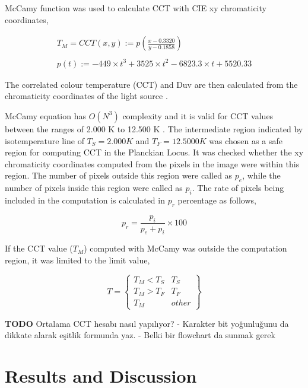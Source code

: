\documentclass{article}
\begin{document}
McCamy function \cite{davis2020correlated} was used to calculate CCT with CIE xy chromaticity coordinates,

\begin{equation}
\begin{matrix}
    T_M = CCT(x, y) := p\left ( \frac{x-0.3320}{y-0.1858} \right )\\
    \\
    p(t) := -449 \times t^3 + 3525 \times t^2 - 6823.3 \times t + 5520.33
\end{matrix}
\label{eq:xy2TM}
\end{equation}

The correlated colour temperature (CCT) and Duv are then calculated from the chromaticity coordinates of the light source \cite{ohno2014practical}. 

McCamy equation has $O(N^3)$ complexity and it is valid for CCT values between the ranges of 2.000 K to 12.500 K \cite{mccamy1992correlated, mccamy1993correlated}. The intermediate region indicated by isotemperature line of $T_S=2.000 K$ and $T_F=12.5000 K$ was chosen as a safe region for computing CCT in the Planckian Locus. It was checked whether the xy chromaticity coordinates computed from the pixels in the image were within this region. The number of pixels outside this region were called as $p_e$, while the number of pixels inside this region were called as $p_i$. The rate of pixels being included in the computation is calculated in $p_r$ percentage as follows,

\begin{equation}
p_r = \frac{p_i}{p_e + p_i} \times 100
\label{eq:pr}
\end{equation}

If the CCT value ($T_M$) computed with McCamy was outside the computation region, it was limited to the limit value,

\begin{equation}
T = \left \{ 
\begin{matrix}
T_M < T_S & T_S\\
T_M > T_F & T_F\\
T_M & other
\end{matrix}
\right \}
\label{eq:TS_TF}
\end{equation}

\textbf{TODO} Ortalama CCT hesabı nasıl yapılıyor?
- Karakter bit yoğunluğunu da dikkate alarak eşitlik formunda yaz.
- Belki bir flowchart da sunmak gerek

\section{Results and Discussion}
\end{document}
